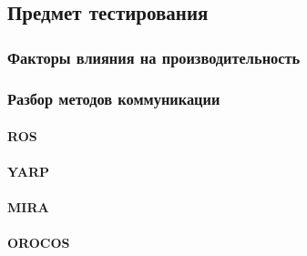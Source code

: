 \chapter{}
\label{title:chapter2}

\section{Предмет тестирования}
\label{title:chapter2:performance_subject}
	\subsection{Факторы влияния на производительность \marm{}}
	\label{title:chapter2:performance_factors}
	
	
	\subsection{Разбор методов коммуникации \marm{}}
	\label{title:chapter2:performance_approaches}
		\subsubsection{ROS}
		\label{title:chapter2:performance_ros_approaches}
		
		
		\subsubsection{YARP}
		\label{title:chapter2:performance_yarp_approaches}
		

		\subsubsection{MIRA}
		\label{title:chapter2:performance_mira_approaches}
		
		
		\subsubsection{OROCOS}
		\label{title:chapter2:performance_orocos_approaches}
		

\section{}
\label{title:chapter2:performance_test_cases}

	
